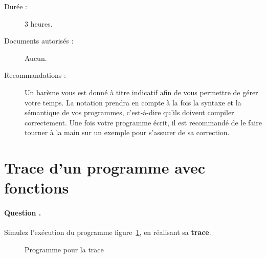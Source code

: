 

\setcounter{questioncount}{0}
\newcommand{\question}{\addtocounter{questioncount}{1}\paragraph{Question \Alph{questioncount}.}}
\newcommand{\commentaire}[1]{}
\newcommand{\pt}[1]{\fbox{$#1 \operatorname{pt}$}}


\setlength{\abovecaptionskip}{-10pt}



\vspace{-1cm}
\begin{description}
\item[Durée :] 3 heures.
\item[Documents autorisés :] Aucun.
\item[Recommandations :] Un barème vous est donné à
titre indicatif afin de vous permettre de gérer votre temps. La
notation prendra en compte à la fois la syntaxe et la sémantique de
vos programmes, c'est-à-dire qu'ils doivent compiler correctement. Une
fois votre programme écrit, il est recommandé de le faire tourner à la
main sur un exemple pour s'assurer de sa correction.
\end{description}


\section{Trace d'un programme avec fonctions}

\question Simulez l'exécution du programme figure~\ref{fig:prog}, en réalisant sa
\textbf{trace}. 

\begin{figure}[htbp]
  \centering
\begin{small}
\end{small} 
  \caption{Programme pour la trace}
  \label{fig:prog}
\end{figure}

